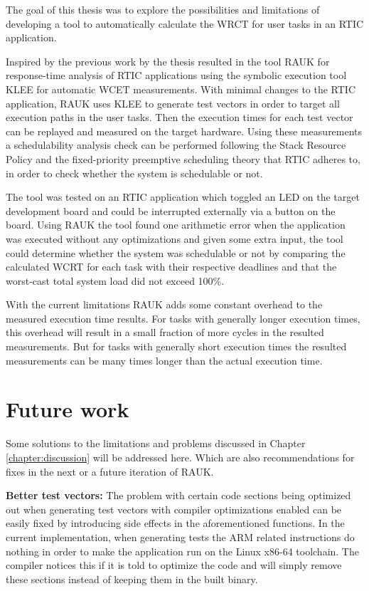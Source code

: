 The goal of this thesis was to explore the possibilities and limitations of
developing a tool to automatically calculate the WRCT for user tasks in an
RTIC application.

Inspired by the previous work by \cite{lindner} the thesis resulted in the tool
RAUK for response-time analysis of RTIC applications using the symbolic
execution tool KLEE for automatic WCET measurements. With minimal changes to
the RTIC application, RAUK uses KLEE to generate test vectors in order to
target all execution paths in the user tasks. Then the execution times for each
test vector can be replayed and measured on the target hardware. Using these
measurements a schedulability analysis check can be performed following the Stack
Resource Policy and the fixed-priority preemptive scheduling theory that RTIC
adheres to, in order to check whether the system is schedulable or not.

The tool was tested on an RTIC application which toggled an LED on the
target development board and could be interrupted externally via a button
on the board. Using RAUK the tool found one arithmetic error when the
application was executed without any optimizations and given some extra input,
the tool could determine whether the system was schedulable or not by comparing
the calculated WCRT for each task with their respective deadlines and that the
worst-cast total system load did not exceed 100\%.

With the current limitations RAUK adds some constant overhead to the measured
execution time results. For tasks with generally longer execution times, this
overhead will result in a small fraction of more cycles in the resulted
measurements. But for tasks with generally short execution times the resulted
measurements can be many times longer than the actual execution time.

\section{Future work}
Some solutions to the limitations and problems discussed in Chapter
\ref{chapter:discussion} will be addressed here. Which are also recommendations
for fixes in the next or a future iteration of RAUK.

\textbf{Better test vectors:} The problem with certain code sections being
optimized out when generating test vectors with compiler optimizations enabled
can be easily fixed by introducing side effects in the aforementioned
functions. In the current implementation, when generating tests the ARM related
instructions do nothing in order to make the application run on the Linux
x86-64 toolchain. The compiler notices this if it is told to optimize the code
and will simply remove these sections instead of keeping them in the built
binary.

